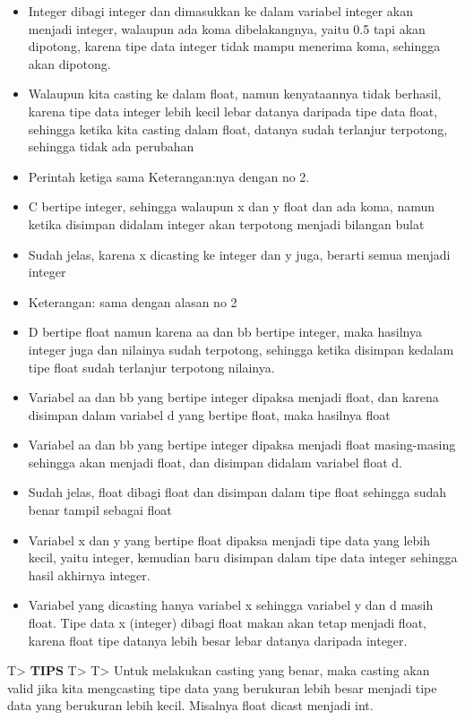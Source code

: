 \begin{itemize}
\tightlist
\item
  Integer dibagi integer dan dimasukkan ke dalam variabel integer akan
  menjadi integer, walaupun ada koma dibelakangnya, yaitu 0.5 tapi akan
  dipotong, karena tipe data integer tidak mampu menerima koma, sehingga
  akan dipotong.
\item
  Walaupun kita casting ke dalam float, namun kenyataannya tidak
  berhasil, karena tipe data integer lebih kecil lebar datanya daripada
  tipe data float, sehingga ketika kita casting dalam float, datanya
  sudah terlanjur terpotong, sehingga tidak ada perubahan
\item
  Perintah ketiga sama Keterangan:nya dengan no 2.
\item
  C bertipe integer, sehingga walaupun x dan y float dan ada koma, namun
  ketika disimpan didalam integer akan terpotong menjadi bilangan bulat
\item
  Sudah jelas, karena x dicasting ke integer dan y juga, berarti semua
  menjadi integer
\item
  Keterangan: sama dengan alasan no 2
\item
  D bertipe float namun karena aa dan bb bertipe integer, maka hasilnya
  integer juga dan nilainya sudah terpotong, sehingga ketika disimpan
  kedalam tipe float sudah terlanjur terpotong nilainya.
\item
  Variabel aa dan bb yang bertipe integer dipaksa menjadi float, dan
  karena disimpan dalam variabel d yang bertipe float, maka hasilnya
  float
\item
  Variabel aa dan bb yang bertipe integer dipaksa menjadi float
  masing-masing sehingga akan menjadi float, dan disimpan didalam
  variabel float d.
\item
  Sudah jelas, float dibagi float dan disimpan dalam tipe float sehingga
  sudah benar tampil sebagai float
\item
  Variabel x dan y yang bertipe float dipaksa menjadi tipe data yang
  lebih kecil, yaitu integer, kemudian baru disimpan dalam tipe data
  integer sehingga hasil akhirnya integer.
\item
  Variabel yang dicasting hanya variabel x sehingga variabel y dan d
  masih float. Tipe data x (integer) dibagi float makan akan tetap
  menjadi float, karena float tipe datanya lebih besar lebar datanya
  daripada integer.
\end{itemize}

T\textgreater{} \textbf{TIPS} T\textgreater{} T\textgreater{} Untuk
melakukan casting yang benar, maka casting akan valid jika kita
mengcasting tipe data yang berukuran lebih besar menjadi tipe data yang
berukuran lebih kecil. Misalnya float dicast menjadi int.

